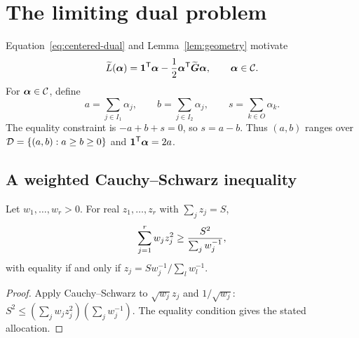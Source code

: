 \section{The limiting dual problem}
Equation~\eqref{eq:centered-dual} and Lemma~\ref{lem:geometry} motivate
\begin{equation}\label{eq:Ltilde}
\widetilde L(\boldsymbol\alpha)=\mathbf{1}^{\mathsf{T}}\boldsymbol\alpha-\frac12\boldsymbol\alpha^{\mathsf{T}}\widetilde{\boldsymbol G}\boldsymbol\alpha,
\qquad \boldsymbol\alpha\in\mathcal{C}.
\end{equation}
For $\boldsymbol\alpha\in\mathcal{C}$, define
\[
a=\sum_{j\in I_1}\alpha_j,\qquad
b=\sum_{j\in I_2}\alpha_j,\qquad
s=\sum_{k\in O}\alpha_k.
\]
The equality constraint is $-a+b+s=0$, so $s=a-b$. Thus $(a,b)$ ranges over
$\mathcal{D}=\{(a,b):a\ge b\ge0\}$ and $\mathbf{1}^{\mathsf{T}}\boldsymbol\alpha=2a$.

\subsection{A weighted Cauchy--Schwarz inequality}
\begin{lemma}\label{lem:weighted-cs}
Let $w_1,\ldots,w_r>0$. For real $z_1,\ldots,z_r$ with $\sum_jz_j=S$,
\[
\sum_{j=1}^{r}w_jz_j^2\ge {S^2\over\sum_jw_j^{-1}},
\]
with equality if and only if $z_j=Sw_j^{-1}/\sum_lw_l^{-1}$.
\end{lemma}
\begin{proof}
Apply Cauchy--Schwarz to $\sqrt{w_j}z_j$ and $1/\sqrt{w_j}$:
$S^2\le(\sum_jw_jz_j^2)(\sum_jw_j^{-1})$. The equality condition gives the stated allocation.
\end{proof}


